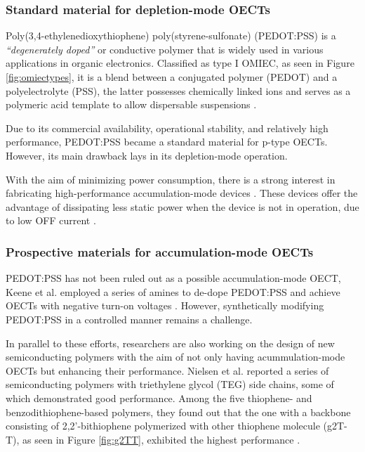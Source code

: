 \subsubsection{Standard material for depletion-mode OECTs}

Poly(3,4-ethylenedioxythiophene) poly(styrene-sulfonate) (PEDOT:PSS) is a \textit{``degenerately doped''} \cite{bernardsSteadyStateTransientBehavior2007} or conductive polymer that is widely used in various applications in organic electronics. Classified as type I OMIEC, as seen in Figure \ref{fig:omiectypes}, it is a blend between a conjugated polymer (PEDOT) and a polyelectrolyte (PSS), the latter possesses chemically linked ions and serves as a polymeric acid template to allow dispersable suspensions \cite{paulsenOrganicMixedIonic2020}.

Due to its commercial availability, operational stability, and relatively high performance, PEDOT:PSS became a standard material for p-type OECTs. However, its main drawback lays in its depletion-mode operation.

With the aim of minimizing power consumption, there is a strong interest in fabricating high-performance accumulation-mode devices \cite{nielsenMolecularDesignSemiconducting2016}\cite{tanOrganicMixedIonic2022}\cite{inalBenchmarkingOrganicMixed2017}\cite{keeneEnhancementModePEDOTPSS2020}. These devices offer the advantage of dissipating less static power when the device is not in operation, due to low OFF current %
\cite{giovannittiEnergeticControlRedoxActive2020}.

\subsubsection{Prospective materials for accumulation-mode OECTs}
PEDOT:PSS has not been ruled out as a possible accumulation-mode OECT, Keene et al. employed a series of amines to de-dope PEDOT:PSS and achieve OECTs with negative turn-on voltages \cite{keeneEnhancementModePEDOTPSS2020}. However, synthetically modifying PEDOT:PSS in a controlled manner remains a challenge. 

In parallel to these efforts, researchers are also working on the design of new semiconducting polymers with the aim of not only having acummulation-mode OECTs but enhancing their performance. Nielsen et al. reported a series of semiconducting polymers with triethylene glycol (TEG) side chains, some of which demonstrated good performance. Among the five thiophene- and benzodithiophene-based polymers, they found out that the one with a %
backbone consisting of 2,2'-bithiophene polymerized with other thiophene molecule (g2T-T), as seen in Figure \ref{fig:g2TT}, exhibited the highest performance %
\cite{nielsenMolecularDesignSemiconducting2016}.

